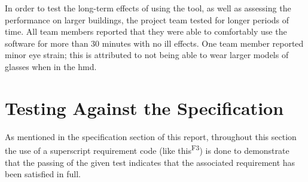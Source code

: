 In order to test the long-term effects of using the tool, as well as assessing the performance on larger buildings, the project team tested for longer periods of time. All team members reported that they were able to comfortably use the software for more than 30 minutes with no ill effects. One team member reported minor eye strain; this is attributed to not being able to wear larger models of glasses when in the \acrshort{hmd}.



\section{Testing Against the Specification}

As mentioned in the specification section of this report, throughout this section the use of a superscript requirement code (like this\textsuperscript{F3}) is done to demonstrate that the passing of the given test indicates that the associated requirement has been satisfied in full.